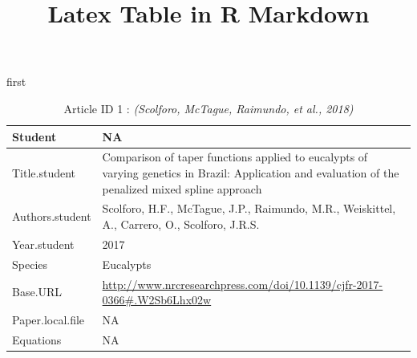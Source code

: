 \documentclass[]{article}
\title{Latex Table in R Markdown}
\author{}
\date{}
\begin{document}
\maketitle

first \newline

\renewcommand{\arraystretch}{2}

\begin{table}
\caption{
Article ID 1 : \textit{(Scolforo, McTague, Raimundo, et al., 2018)}\\
}
\begin{tabular}{p{} p{}}
\hline
Student & NA \\ \hline
Title.student & Comparison of taper functions applied to eucalypts of varying genetics in Brazil: Application and evaluation of the penalized mixed spline approach \\ \hline
Authors.student & Scolforo, H.F., McTague, J.P., Raimundo, M.R., Weiskittel, A., Carrero, O., Scolforo, J.R.S. \\ \hline
Year.student & 2017 \\ \hline
Species & Eucalypts \\ \hline
Base.URL & \url{http://www.nrcresearchpress.com/doi/10.1139/cjfr-2017-0366#.W2Sb6Lhx02w} \\ \hline
Paper.local.file & NA \\ \hline
Equations & NA \\ \hline
\end{tabular}\end{table}
\end{document}
